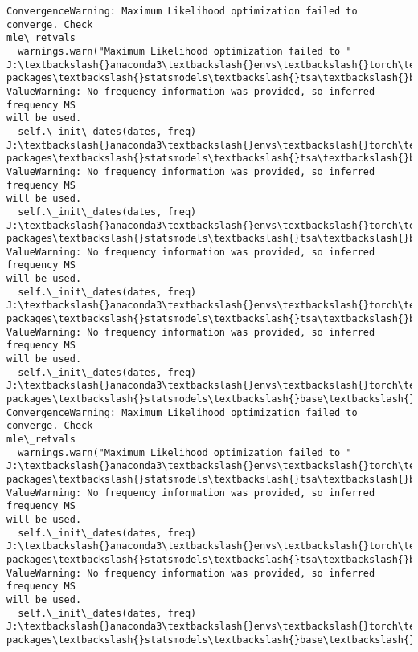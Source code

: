 \documentclass[11pt]{article}
\begin{document}
\begin{Verbatim}[commandchars=\\\{\}]
ConvergenceWarning: Maximum Likelihood optimization failed to converge. Check
mle\_retvals
  warnings.warn("Maximum Likelihood optimization failed to "
J:\textbackslash{}anaconda3\textbackslash{}envs\textbackslash{}torch\textbackslash{}Lib\textbackslash{}site-packages\textbackslash{}statsmodels\textbackslash{}tsa\textbackslash{}base\textbackslash{}tsa\_model.py:473:
ValueWarning: No frequency information was provided, so inferred frequency MS
will be used.
  self.\_init\_dates(dates, freq)
J:\textbackslash{}anaconda3\textbackslash{}envs\textbackslash{}torch\textbackslash{}Lib\textbackslash{}site-packages\textbackslash{}statsmodels\textbackslash{}tsa\textbackslash{}base\textbackslash{}tsa\_model.py:473:
ValueWarning: No frequency information was provided, so inferred frequency MS
will be used.
  self.\_init\_dates(dates, freq)
J:\textbackslash{}anaconda3\textbackslash{}envs\textbackslash{}torch\textbackslash{}Lib\textbackslash{}site-packages\textbackslash{}statsmodels\textbackslash{}tsa\textbackslash{}base\textbackslash{}tsa\_model.py:473:
ValueWarning: No frequency information was provided, so inferred frequency MS
will be used.
  self.\_init\_dates(dates, freq)
J:\textbackslash{}anaconda3\textbackslash{}envs\textbackslash{}torch\textbackslash{}Lib\textbackslash{}site-packages\textbackslash{}statsmodels\textbackslash{}tsa\textbackslash{}base\textbackslash{}tsa\_model.py:473:
ValueWarning: No frequency information was provided, so inferred frequency MS
will be used.
  self.\_init\_dates(dates, freq)
J:\textbackslash{}anaconda3\textbackslash{}envs\textbackslash{}torch\textbackslash{}Lib\textbackslash{}site-packages\textbackslash{}statsmodels\textbackslash{}base\textbackslash{}model.py:607:
ConvergenceWarning: Maximum Likelihood optimization failed to converge. Check
mle\_retvals
  warnings.warn("Maximum Likelihood optimization failed to "
J:\textbackslash{}anaconda3\textbackslash{}envs\textbackslash{}torch\textbackslash{}Lib\textbackslash{}site-packages\textbackslash{}statsmodels\textbackslash{}tsa\textbackslash{}base\textbackslash{}tsa\_model.py:473:
ValueWarning: No frequency information was provided, so inferred frequency MS
will be used.
  self.\_init\_dates(dates, freq)
J:\textbackslash{}anaconda3\textbackslash{}envs\textbackslash{}torch\textbackslash{}Lib\textbackslash{}site-packages\textbackslash{}statsmodels\textbackslash{}tsa\textbackslash{}base\textbackslash{}tsa\_model.py:473:
ValueWarning: No frequency information was provided, so inferred frequency MS
will be used.
  self.\_init\_dates(dates, freq)
J:\textbackslash{}anaconda3\textbackslash{}envs\textbackslash{}torch\textbackslash{}Lib\textbackslash{}site-packages\textbackslash{}statsmodels\textbackslash{}base\textbackslash{}model.py:607:

\end{Verbatim}
\end{document}
